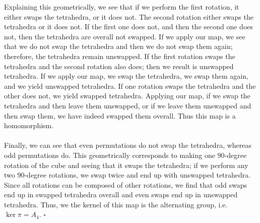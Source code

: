 \documentclass[letterpaper]{article}
\newcommand*{\QED}{\hfill\ensuremath{\square}}%
\begin{document}
Explaining this geometrically, we see that if we perform the first rotation, it either swaps the tetrahedra, or it does not.
The second rotation either swaps the tetrahedra or it does not.
If the first one does not, and then the second one does not, then the tetrahedra are overall not swapped.
If we apply our map, we see that we do not swap the tetrahedra and then we do not swap them again; therefore, the tetrahedra remain unswapped.
If the first rotation swaps the tetrahedra and the second rotation also does; then we result is unswapped tetrahedra.
If we apply our map, we swap the tetrahedra, we swap them again, and we yield unswapped tetrahedra.
If one rotation swaps the tetrahedra and the other does not, we yield swapped tetrahedra.
Applying our map, if we swap the tetrahedra and then leave them unswapped, or if we leave them unswapped and then swap them, we have indeed swapped them overall.
Thus this map is a homomorphism.
\\ \\
Finally, we can see that even permutations do not swap the tetrahedra, whereas odd permutations do.
This geometrically corresponds to making one $ 90 $-degree rotation of the cube and seeing that it swaps the tetrahedra; if we perform any two $ 90 $-degree rotations, we swap twice and end up with unswapped tetrahedra.
Since all rotations can be composed of other rotations, we find that odd swaps end up in swapped tetrahedra overall and even swaps end up in unswapped tetrahedra.
Thus, we the kernel of this map is the alternating group, i.e. $ \ker{\pi} = A_4 $.
\QED{}

\section{}
\label{sec:Question3}
\end{document}

